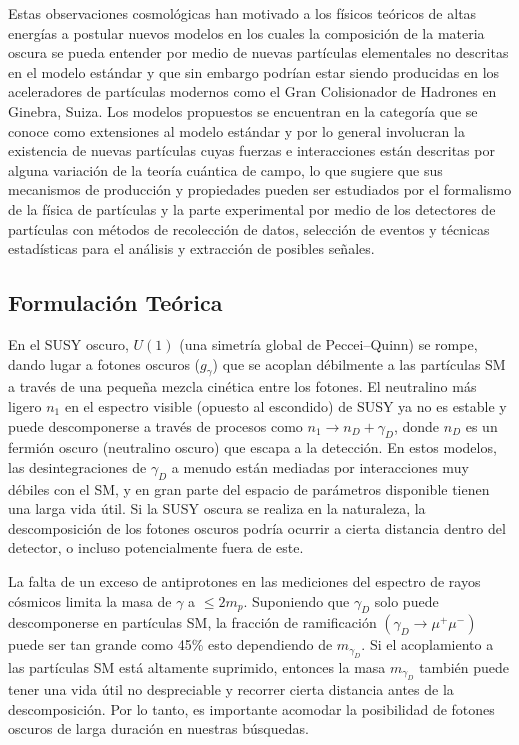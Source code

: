 Estas observaciones cosmológicas han motivado a los físicos teóricos de altas energías a postular nuevos modelos en los cuales la composición de la materia oscura se pueda entender por medio de nuevas partículas elementales no descritas en el modelo estándar y que sin embargo podrían estar siendo producidas en los aceleradores de partículas modernos como el Gran Colisionador de Hadrones en Ginebra, Suiza. Los modelos propuestos se encuentran en la categoría que se conoce como extensiones al modelo estándar y por lo general involucran la existencia de nuevas partículas cuyas fuerzas e interacciones están descritas por alguna variación de la teoría cuántica de campo, lo que sugiere que sus mecanismos de producción y propiedades pueden ser estudiados por el formalismo de la física de partículas y la parte experimental por medio de los detectores de partículas con métodos de recolección de datos, selección de eventos y técnicas estadísticas para el análisis y extracción de posibles señales.

\subsection{Formulación Teórica}



En el SUSY oscuro, $U(1)$ (una simetría global de Peccei–Quinn) se rompe, dando lugar a fotones oscuros ($g_\gamma$) que se acoplan débilmente a las partículas SM a través de una pequeña mezcla cinética entre los fotones. El neutralino más ligero $n_1$ en el espectro visible (opuesto al escondido) de SUSY ya no es estable y puede descomponerse a través de procesos como $n_1\longrightarrow  n_D + \gamma_D$, donde $n_D$ es un fermión oscuro (neutralino oscuro) que escapa a la detección. En estos modelos, las desintegraciones de $\gamma_D$ a menudo están mediadas por interacciones muy débiles con el SM, y en gran parte del espacio de parámetros disponible tienen una larga vida útil. Si la SUSY oscura se realiza en la naturaleza, la descomposición de los fotones oscuros podría ocurrir a cierta distancia dentro del detector, o incluso potencialmente fuera de este.

La falta de un exceso de antiprotones en las mediciones del espectro de rayos cósmicos limita la masa de $\gamma$ a $\leq 2m_p$. Suponiendo que $\gamma_D$ solo puede descomponerse en partículas SM, la fracción de ramificación $(\gamma_D\rightarrow \mu^+\mu^-)$ puede ser tan grande como 45\% esto dependiendo de $m_{\gamma_D}$. Si el acoplamiento a las partículas SM está altamente suprimido, entonces la masa $m_{\gamma_D}$ también puede tener una vida útil no despreciable y recorrer cierta distancia antes de la descomposición. Por lo tanto, es importante acomodar la posibilidad de fotones oscuros de larga duración en nuestras búsquedas.

